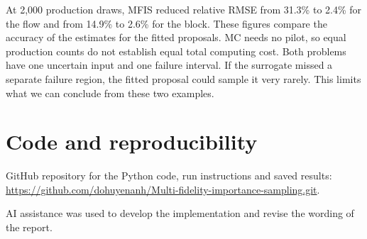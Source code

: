 \documentclass[11pt,a4paper]{article}
\begin{document}
At 2,000 production draws, MFIS reduced relative RMSE from 31.3\% to 2.4\% for the flow and from 14.9\% to 2.6\% for the block. These figures compare the accuracy of the estimates for the fitted proposals. MC needs no pilot, so equal production counts do not establish equal total computing cost. Both problems have one uncertain input and one failure interval. If the surrogate missed a separate failure region, the fitted proposal could sample it very rarely. This limits what we can conclude from these two examples.

\section*{Code and reproducibility}
GitHub repository for the Python code, run instructions and saved results:
\url{https://github.com/dohuyenanh/Multi-fidelity-importance-sampling.git}.

AI assistance was used to develop the implementation and revise the wording of the report.
\end{document}

